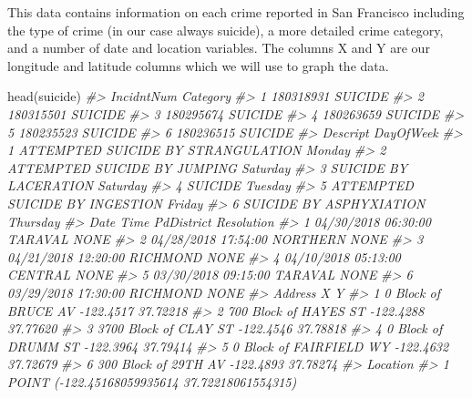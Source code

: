 \documentclass[
]{krantz}
\makeatletter
\newenvironment{Shaded}{\begin{snugshade}}{\end{snugshade}}
\newcommand{\CommentTok}[1]{\textcolor[rgb]{0.37,0.37,0.37}{\textit{#1}}}
\newcommand{\FunctionTok}[1]{\textcolor[rgb]{0,0,0}{#1}}
\newcommand{\NormalTok}[1]{#1}
\newenvironment{kframe}{%
\medskip{}
\setlength{\fboxsep}{.8em}
 \def\at@end@of@kframe{}%
 \ifinner\ifhmode%
  \def\at@end@of@kframe{\end{minipage}}%
  \begin{minipage}{\columnwidth}%
 \fi\fi%
 \def\FrameCommand##1{\hskip\@totalleftmargin \hskip-\fboxsep
 \colorbox{shadecolor}{##1}\hskip-\fboxsep
     \hskip-\linewidth \hskip-\@totalleftmargin \hskip\columnwidth}%
 \MakeFramed {\advance\hsize-\width
   \@totalleftmargin\z@ \linewidth\hsize
   \@setminipage}}%
 {\par\unskip\endMakeFramed%
 \at@end@of@kframe}
\renewenvironment{Shaded}{\begin{kframe}}{\end{kframe}}
\makeatother
\begin{document}
This data contains information on each crime reported in San Francisco including the type of crime (in our case always suicide), a more detailed crime category, and a number of date and location variables. The columns X and Y are our longitude and latitude columns which we will use to graph the data.

\begin{Shaded}
\begin{Highlighting}[]
\FunctionTok{head}\NormalTok{(suicide)}
\CommentTok{\#\textgreater{}   IncidntNum Category}
\CommentTok{\#\textgreater{} 1  180318931  SUICIDE}
\CommentTok{\#\textgreater{} 2  180315501  SUICIDE}
\CommentTok{\#\textgreater{} 3  180295674  SUICIDE}
\CommentTok{\#\textgreater{} 4  180263659  SUICIDE}
\CommentTok{\#\textgreater{} 5  180235523  SUICIDE}
\CommentTok{\#\textgreater{} 6  180236515  SUICIDE}
\CommentTok{\#\textgreater{}                             Descript DayOfWeek}
\CommentTok{\#\textgreater{} 1 ATTEMPTED SUICIDE BY STRANGULATION    Monday}
\CommentTok{\#\textgreater{} 2       ATTEMPTED SUICIDE BY JUMPING  Saturday}
\CommentTok{\#\textgreater{} 3              SUICIDE BY LACERATION  Saturday}
\CommentTok{\#\textgreater{} 4                            SUICIDE   Tuesday}
\CommentTok{\#\textgreater{} 5     ATTEMPTED SUICIDE BY INGESTION    Friday}
\CommentTok{\#\textgreater{} 6            SUICIDE BY ASPHYXIATION  Thursday}
\CommentTok{\#\textgreater{}         Date     Time PdDistrict Resolution}
\CommentTok{\#\textgreater{} 1 04/30/2018 06:30:00    TARAVAL       NONE}
\CommentTok{\#\textgreater{} 2 04/28/2018 17:54:00   NORTHERN       NONE}
\CommentTok{\#\textgreater{} 3 04/21/2018 12:20:00   RICHMOND       NONE}
\CommentTok{\#\textgreater{} 4 04/10/2018 05:13:00    CENTRAL       NONE}
\CommentTok{\#\textgreater{} 5 03/30/2018 09:15:00    TARAVAL       NONE}
\CommentTok{\#\textgreater{} 6 03/29/2018 17:30:00   RICHMOND       NONE}
\CommentTok{\#\textgreater{}                   Address         X        Y}
\CommentTok{\#\textgreater{} 1     0 Block of BRUCE AV {-}122.4517 37.72218}
\CommentTok{\#\textgreater{} 2   700 Block of HAYES ST {-}122.4288 37.77620}
\CommentTok{\#\textgreater{} 3   3700 Block of CLAY ST {-}122.4546 37.78818}
\CommentTok{\#\textgreater{} 4     0 Block of DRUMM ST {-}122.3964 37.79414}
\CommentTok{\#\textgreater{} 5 0 Block of FAIRFIELD WY {-}122.4632 37.72679}
\CommentTok{\#\textgreater{} 6    300 Block of 29TH AV {-}122.4893 37.78274}
\CommentTok{\#\textgreater{}                                         Location}
\CommentTok{\#\textgreater{} 1  POINT ({-}122.45168059935614 37.72218061554315)}

\end{Highlighting}
\end{Shaded}
\end{document}
